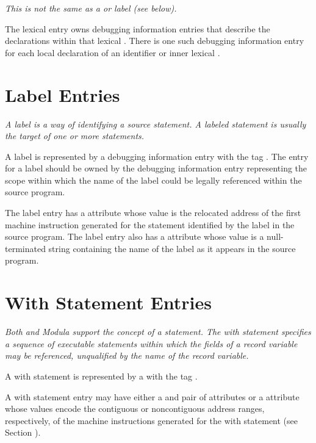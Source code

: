 \textit{This is not the same as a  or 
 label (see below).}

The lexical  entry owns 
debugging information entries that
describe the declarations within that lexical . 
There is
one such debugging information entry for each local declaration
of an identifier or inner lexical .

\section{Label Entries}
\label{chap:labelentries}
\textit{A label is a way of identifying a source statement. A labeled
statement is usually the target of one or more 
statements.
}

A label is represented by a debugging information entry with
the 
tag \DWTAGlabelTARG. 
The entry for a label should be owned by
the debugging information entry representing the scope within
which the name of the label could be legally referenced within
the source program.

The label entry has a \DWATlowpc{} attribute whose value
is the relocated address of the first machine instruction
generated for the statement identified by the label in
the source program.  The label entry also has a 
\DWATname{} attribute 
whose value is a null-terminated string containing
the name of the label as it appears in the source program.


\section{With Statement Entries}
\label{chap:withstatemententries}

\textit{Both  and 
Modula support the concept of a 
statement. The with statement specifies a sequence of
executable statements within which the fields of a record
variable may be referenced, unqualified by the name of the
record variable.}

A with statement is represented by a
with the tag \DWTAGwithstmtTARG.

A with statement entry may have either a 
\DWATlowpc{} and
\DWAThighpc{} pair of attributes 
or 
a \DWATranges{} attribute
whose values encode the contiguous or non\dash contiguous address
ranges, respectively, of the machine instructions generated
for the with statement 
(see Section ).

